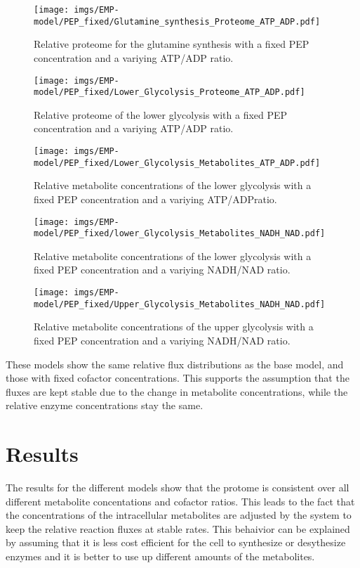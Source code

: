 \begin{figure}[H]
    \centering
    \texttt{[image: imgs/EMP-model/PEP\_fixed/Glutamine\_synthesis\_Proteome\_ATP\_ADP.pdf]}
    \caption{Relative proteome for the glutamine synthesis with a fixed PEP concentration and a variying ATP/ADP ratio.}
    \label{fig:glutamine_proteome_pep_fixed_atp}
\end{figure}

\begin{figure}[H]
    \centering
    \texttt{[image: imgs/EMP-model/PEP\_fixed/Lower\_Glycolysis\_Proteome\_ATP\_ADP.pdf]}
    \caption{Relative proteome of the lower glycolysis with a fixed PEP concentration and a variying ATP/ADP ratio.}
    \label{fig:lower_proteome_pep_fixed_atp}
\end{figure}

\begin{figure}[H]
    \centering
    \texttt{[image: imgs/EMP-model/PEP\_fixed/Lower\_Glycolysis\_Metabolites\_ATP\_ADP.pdf]}
    \caption{Relative metabolite concentrations of the lower glycolysis with a fixed PEP concentration and a variying ATP/ADPratio.}
    \label{fig:lower_metabolites_pep_fixed_atp}
\end{figure}

\begin{figure}[H]
    \centering
    \texttt{[image: imgs/EMP-model/PEP\_fixed/lower\_Glycolysis\_Metabolites\_NADH\_NAD.pdf]}
    \caption{Relative metabolite concentrations of the lower glycolysis with a fixed PEP concentration and a variying NADH/NAD ratio.}
    \label{fig:lower_metabolites_pep_fixed_nadh}
\end{figure}

\begin{figure}[H]
    \centering
    \texttt{[image: imgs/EMP-model/PEP\_fixed/Upper\_Glycolysis\_Metabolites\_NADH\_NAD.pdf]}
    \caption{Relative metabolite concentrations of the upper glycolysis with a fixed PEP concentration and a variying NADH/NAD ratio.}
    \label{fig:upper_metabolite_pep_fixed_nadh}
\end{figure}

These models show the same relative flux distributions as the base model, and those with fixed cofactor concentrations. This supports the assumption that the fluxes are kept stable due to the change in metabolite concentrations, while the relative enzyme concentrations stay the same.

\section{Results}
The results for the different models show that the protome is consistent over all different metabolite concentations and cofactor ratios. This leads to the fact that the concentrations of the intracellular metabolites are adjusted by the system to keep the relative reaction fluxes at stable rates. 
This behaivior can be explained by assuming that it is less cost efficient for the cell to synthesize or desythesize enzymes and it is better to use up different amounts of the metabolites. 

